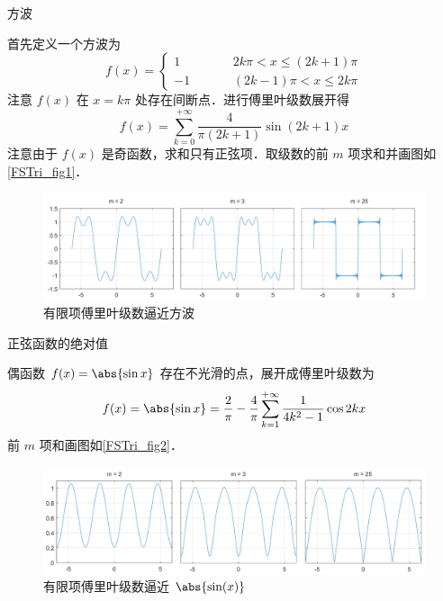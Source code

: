 
\begin{exam}{方波}

首先定义一个方波为
\begin{equation}
f(x) = \left\{ \begin{aligned}
1& \quad && 2k\pi < x \le (2k + 1)\pi \\
- 1& &&   (2k - 1)\pi < x \le 2k\pi 
\end{aligned}\right.
\end{equation}
注意 $f(x)$ 在 $x=k\pi$ 处存在间断点．进行傅里叶级数展开得
\begin{equation}
f(x) = \sum_{k = 0}^{+\infty} \frac{4}{{\pi (2k + 1)}}\sin (2k + 1)x
\end{equation}
注意由于 $f(x)$ 是奇函数，求和只有正弦项．取级数的前 $m$ 项求和并画图如\autoref{FSTri_fig1}．

\begin{figure}[ht]
\centering
\includegraphics[width=14.5cm]{./figures/FSTri1.pdf}
\caption{有限项傅里叶级数逼近方波}\label{FSTri_fig1}
\end{figure}
\end{exam}

\begin{exam}{正弦函数的绝对值} %

偶函数 $f(x) = \abs{\sin x}$ 存在不光滑的点，展开成傅里叶级数为
\begin{equation}
f(x) = \abs{\sin x} = \frac{2}{\pi } - \frac{4}{\pi }\sum_{k = 1}^{+\infty} \frac{1}{{4 k^2 - 1}}\cos 2k x
\end{equation}
前 $m$ 项和画图如\autoref{FSTri_fig2}．
\begin{figure}[ht]
\centering
\includegraphics[width=14.5cm]{./figures/FSTri2.pdf}
\caption{有限项傅里叶级数逼近 $\abs{\sin(x)}$}\label{FSTri_fig2}
\end{figure}
\end{exam}


